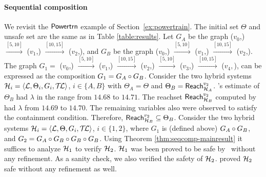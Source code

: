 \paragraph{Sequential composition}
We revisit the ${\operatorname{\mathsf{Powertrn}}}$ example of
Section~\ref{ex:powertrain}. The initial set $\Theta$ and unsafe set
are the same as in Table \ref{table:results}.  Let $G_A$ be the graph
($v_0$,) $\xrightarrow{[5,10]}$ ($v_1$,)
$\xrightarrow{[10,15]}$ ($v_2$,), and $G_B$ be the
graph ($v_0$,) $\xrightarrow{[5,10]}$
($v_1$,) $\xrightarrow{[10,15]}$
($v_2$,).  The graph $G_1 =$ ($v_0$,)
$\xrightarrow{[5,10]}$ ($v_1$,) $\xrightarrow{[10,15]}$
($v_2$,) $\xrightarrow{[5,10]}$ ($v_3$,)
$\xrightarrow{[10,15]}$ ($v_4, $), can be expressed as
the composition $G_1 = G_A \circ G_B$. Consider the two hybrid
systems ${\mathcal H}_i = \langle {\mathcal L}, \Theta_i, G_i, \mathcal{T\mkern-3mu L} \rangle$, $i \in
\{A,B\}$ with $\Theta_A = \Theta$ and $\Theta_B =
\reach{\H_A}^{v_2}$. {\toolname}'s estimate of $\Theta_{B}$ had
$\lambda$ in the range from $14.68$ to $14.71$. The reachset
$\reach{\H_B}^{v_2}$ computed by {\toolname} had $\lambda$ from
$14.69$ to $14.70$. The remaining variables also were observed to
satisfy the containment condition. Therefore, $\reach{\H_B}^{v_2}
\subseteq \Theta_{B}$.  Consider the two hybrid systems ${\mathcal H}_i =
\langle {\mathcal L}, \Theta, G_i, \mathcal{T\mkern-3mu L} \rangle$, $i \in \{1,2\}$, where $G_1$ is
(defined above) $ G_A \circ G_B$, and $G_2 = G_A \circ G_B
\circ G_B \circ G_B$.  Using Theorem
\ref{thm:seqcomp-mainresult} it suffices to analyze ${\mathcal H}_1$ to verify
${\mathcal H}_2$.  ${\mathcal H}_1$ was been proved to be safe by \toolname\ without any
refinement.  As a sanity check, we also verified the safety of ${\mathcal H}_2$.
{\toolname} proved ${\mathcal H}_2$ safe without any refinement as well.
